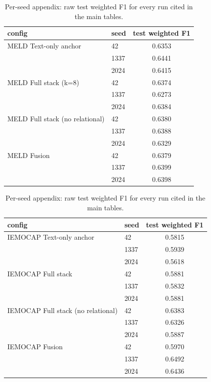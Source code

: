\begin{table}[t]
\centering
\caption{Per-seed appendix: raw test weighted F1 for every run cited in the main tables.}
\label{tab:per-seed-appendix}
\begin{minipage}{0.48\textwidth}
\centering
\small
\setlength{\tabcolsep}{3.5pt}
\begin{tabular}{p{3.5cm}lc}
\toprule
config & seed & test weighted F1 \\
\midrule
MELD Text-only anchor & 42 & 0.6353 \\
 & 1337 & 0.6441 \\
 & 2024 & 0.6415 \\
\addlinespace
MELD Full stack (k=8) & 42 & 0.6374 \\
 & 1337 & 0.6273 \\
 & 2024 & 0.6384 \\
\addlinespace
MELD Full stack (no relational) & 42 & 0.6380 \\
 & 1337 & 0.6388 \\
 & 2024 & 0.6329 \\
\addlinespace
MELD Fusion & 42 & 0.6379 \\
 & 1337 & 0.6399 \\
 & 2024 & 0.6398 \\
\bottomrule
\end{tabular}
\end{minipage}%
\hfill
\begin{minipage}{0.48\textwidth}
\centering
\small
\setlength{\tabcolsep}{3.5pt}
\begin{tabular}{p{3.5cm}lc}
\toprule
config & seed & test weighted F1 \\
\midrule
IEMOCAP Text-only anchor & 42 & 0.5815 \\
 & 1337 & 0.5939 \\
 & 2024 & 0.5618 \\
\addlinespace
IEMOCAP Full stack & 42 & 0.5881 \\
 & 1337 & 0.5832 \\
 & 2024 & 0.5881 \\
\addlinespace
IEMOCAP Full stack (no relational) & 42 & 0.6383 \\
 & 1337 & 0.6326 \\
 & 2024 & 0.5887 \\
\addlinespace
IEMOCAP Fusion & 42 & 0.5970 \\
 & 1337 & 0.6492 \\
 & 2024 & 0.6436 \\
\bottomrule
\end{tabular}
\end{minipage}
\end{table}

